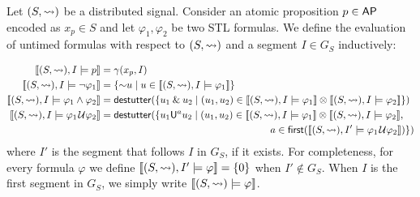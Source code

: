 Let  $(S, {\rightsquigarrow})$ be a distributed signal.
Consider an atomic proposition $p \in \mathsf{AP}$ encoded as $x_p \in S$ and let $\varphi_1, \varphi_2$ be two STL formulas.
We define the evaluation of untimed formulas with respect to $(S, {\rightsquigarrow})$ and a segment $I \in G_S$ inductively:

\vspace{-0.8em}
\scriptsize
\begin{align*}
	\llbracket (S, {\hb}), I \models p \rrbracket &= \gamma(x_p, I) \\
	\llbracket (S, {\hb}), I \models \lnot \varphi_1 \rrbracket &= \{\BitNeg u \st u \in  \llbracket (S, {\hb}), I \models \varphi_1 \rrbracket \} \\
	\llbracket (S, {\hb}), I \models \varphi_1 \land \varphi_2 \rrbracket &= \destutter(\{ u_1 \BitAnd u_2 \st (u_1, u_2) \in \llbracket (S, {\hb}), I \models \varphi_1 \rrbracket \otimes \llbracket (S, {\hb}), I \models \varphi_2 \rrbracket  \}) \\
	\llbracket (S, {\hb}), I \models \varphi_1 \until \varphi_2 \rrbracket &= \destutter(\{ u_1 \mathsf{U}^a u_2 \st (u_1, u_2) \in \llbracket (S, {\hb}), I \models \varphi_1 \rrbracket \otimes \llbracket (S, {\hb}), I \models \varphi_2 \rrbracket, \\
	 &\hspace{17em} a \in \first(\llbracket (S, {\hb}), I' \models \varphi_1 \until \varphi_2 \rrbracket) \})
\end{align*}
\normalsize
where $I'$ is the segment that follows $I$ in $G_S$, if it exists.
For completeness, for every formula $\varphi$ we define $\llbracket (S, {\rightsquigarrow}), I' \models \varphi \rrbracket = \{0\}$ when $I' \notin G_S$.
When $I$ is the first segment in $G_S$, we simply write $\llbracket (S, {\rightsquigarrow}) \models \varphi \rrbracket$.
